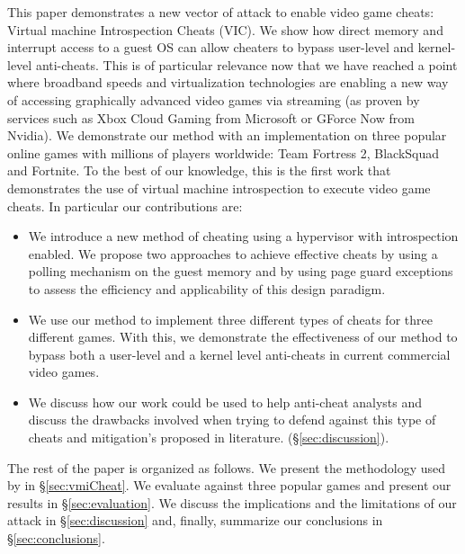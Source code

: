 This paper demonstrates a new vector of attack to enable video game cheats: Virtual machine Introspection Cheats (VIC). We show how direct memory and interrupt access to a guest OS can allow cheaters to bypass user-level and kernel-level anti-cheats. This is of particular relevance now that we have reached a point where broadband speeds and virtualization technologies are enabling a new way of accessing graphically advanced video games via streaming (as proven by services such as Xbox Cloud Gaming from Microsoft or GForce Now from Nvidia). We demonstrate our method with an implementation on three popular online games with millions of players worldwide: Team Fortress 2, BlackSquad and Fortnite. To the best of our knowledge, this is the first work that demonstrates the use of virtual machine introspection to execute video game cheats. In particular our contributions are:
\begin{itemize}
    \item We introduce a new method of cheating using a hypervisor with introspection enabled. We propose two approaches to achieve effective cheats by using a polling mechanism on the guest memory and by using page guard exceptions to assess the efficiency and applicability of this design paradigm.
    \item We use our method to implement three different types of cheats for three different games. With this, we demonstrate the effectiveness of our method to bypass both a user-level and a kernel level anti-cheats in current commercial video games.
    \item We discuss how our work could be used to help anti-cheat analysts and discuss the drawbacks involved when trying to defend against this type of cheats and mitigation's proposed in literature. 
    (\S\ref{sec:discussion}).
   
\end{itemize}

The rest of the paper is organized as follows.
We present the methodology used by \frameworkName in \S\ref{sec:vmiCheat}. 
We evaluate \frameworkName against three popular games and present our results in  \S\ref{sec:evaluation}. We discuss the implications and the limitations of our attack in \S\ref{sec:discussion} and, finally, summarize our conclusions in \S\ref{sec:conclusions}.
